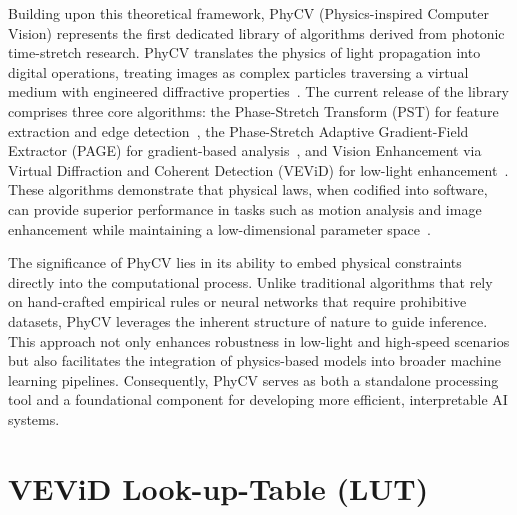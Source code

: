 \documentclass[journal,transmag]{IEEEtran}
\begin{document}
Building upon this theoretical framework, PhyCV (Physics-inspired Computer Vision) represents the first dedicated library of algorithms derived from photonic time-stretch research. PhyCV translates the physics of light propagation into digital operations, treating images as complex particles traversing a virtual medium with engineered diffractive properties~\cite{zhou2023phycv}. The current release of the library comprises three core algorithms: the Phase-Stretch Transform (PST) for feature extraction and edge detection~\cite{asghari2015edge}, the Phase-Stretch Adaptive Gradient-Field Extractor (PAGE) for gradient-based analysis~\cite{suthar2017fast}, and Vision Enhancement via Virtual Diffraction and Coherent Detection (VEViD) for low-light enhancement~\cite{jalali2022vevid}. These algorithms demonstrate that physical laws, when codified into software, can provide superior performance in tasks such as motion analysis and image enhancement while maintaining a low-dimensional parameter space~\cite{deVore2014coherent}.

The significance of PhyCV lies in its ability to embed physical constraints directly into the computational process. Unlike traditional algorithms that rely on hand-crafted empirical rules or neural networks that require prohibitive datasets, PhyCV leverages the inherent structure of nature to guide inference. This approach not only enhances robustness in low-light and high-speed scenarios but also facilitates the integration of physics-based models into broader machine learning pipelines. Consequently, PhyCV serves as both a standalone processing tool and a foundational component for developing more efficient, interpretable AI systems.
\section{VEViD Look-up-Table (LUT)}
\end{document}
